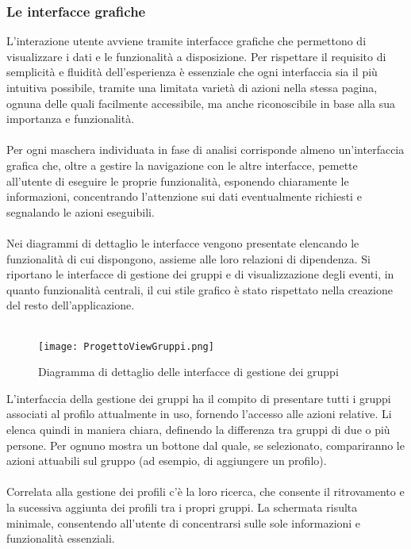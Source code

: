 \subsubsection{Le interfacce grafiche}
L'interazione utente avviene tramite interfacce grafiche 
che permettono di visualizzare i dati e le funzionalità a disposizione. 
Per rispettare il requisito di semplicità e fluidità dell'esperienza è essenziale che 
ogni interfaccia sia il più intuitiva possibile, tramite una limitata varietà di azioni nella stessa pagina,
ognuna delle quali facilmente accessibile, ma anche riconoscibile in base alla sua importanza e funzionalità.\\
\\
Per ogni maschera individuata in fase di analisi corrisponde almeno un'interfaccia grafica che, 
oltre a gestire la navigazione con le altre interfacce, 
pemette all'utente di eseguire le proprie funzionalità,
esponendo chiaramente le informazioni,
concentrando l'attenzione sui dati eventualmente richiesti e segnalando le azioni eseguibili.\\
\\
Nei diagrammi di dettaglio le interfacce vengono presentate elencando le funzionalità di cui dispongono, 
assieme alle loro relazioni di dipendenza.
Si riportano le interfacce di gestione dei gruppi e di visualizzazione degli eventi, 
in quanto funzionalità centrali, il cui stile grafico è stato rispettato nella creazione del resto dell'applicazione.\\
\\
\begin{figure}[htbp]
    \begin{center}
        \texttt{[image: ProgettoViewGruppi.png]}
        \caption{Diagramma di dettaglio delle interfacce di gestione dei gruppi}
    \end{center}
\end{figure}
\clearpage
L'interfaccia della gestione dei gruppi ha il compito di presentare tutti i gruppi associati al profilo attualmente in uso,
fornendo l'accesso alle azioni relative. 
Li elenca quindi in maniera chiara, definendo la differenza tra gruppi di due o più persone.
Per ognuno mostra un bottone dal quale, se selezionato, compariranno le azioni attuabili sul gruppo 
(ad esempio, di aggiungere un profilo).\\
\\
Correlata alla gestione dei profili c'è la loro ricerca, 
che consente il ritrovamento e la sucessiva aggiunta dei profili tra i propri gruppi.
La schermata risulta minimale, consentendo all'utente di concentrarsi sulle sole informazioni e funzionalità essenziali.\\
\\


